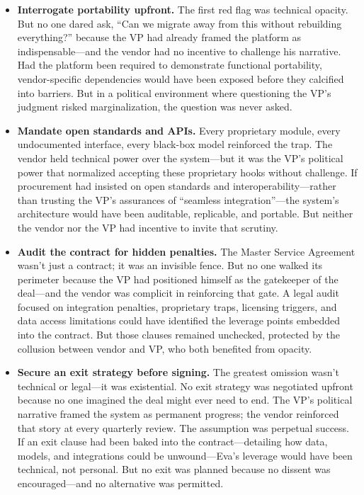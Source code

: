 \begin{itemize}
    \item \textbf{Interrogate portability upfront.} The first red flag was technical opacity. But no one dared ask, “Can we migrate away from this without rebuilding everything?” because the VP had already framed the platform as indispensable—and the vendor had no incentive to challenge his narrative. Had the platform been required to demonstrate functional portability, vendor-specific dependencies would have been exposed before they calcified into barriers. But in a political environment where questioning the VP’s judgment risked marginalization, the question was never asked.

    \item \textbf{Mandate open standards and APIs.} Every proprietary module, every undocumented interface, every black-box model reinforced the trap. The vendor held technical power over the system—but it was the VP’s political power that normalized accepting these proprietary hooks without challenge. If procurement had insisted on open standards and interoperability—rather than trusting the VP’s assurances of “seamless integration”—the system’s architecture would have been auditable, replicable, and portable. But neither the vendor nor the VP had incentive to invite that scrutiny.

    \item \textbf{Audit the contract for hidden penalties.} The Master Service Agreement wasn’t just a contract; it was an invisible fence. But no one walked its perimeter because the VP had positioned himself as the gatekeeper of the deal—and the vendor was complicit in reinforcing that gate. A legal audit focused on integration penalties, proprietary traps, licensing triggers, and data access limitations could have identified the leverage points embedded into the contract. But those clauses remained unchecked, protected by the collusion between vendor and VP, who both benefited from opacity.

    \item \textbf{Secure an exit strategy before signing.} The greatest omission wasn’t technical or legal—it was existential. No exit strategy was negotiated upfront because no one imagined the deal might ever need to end. The VP’s political narrative framed the system as permanent progress; the vendor reinforced that story at every quarterly review. The assumption was perpetual success. If an exit clause had been baked into the contract—detailing how data, models, and integrations could be unwound—Eva’s leverage would have been technical, not personal. But no exit was planned because no dissent was encouraged—and no alternative was permitted.


\end{itemize}
